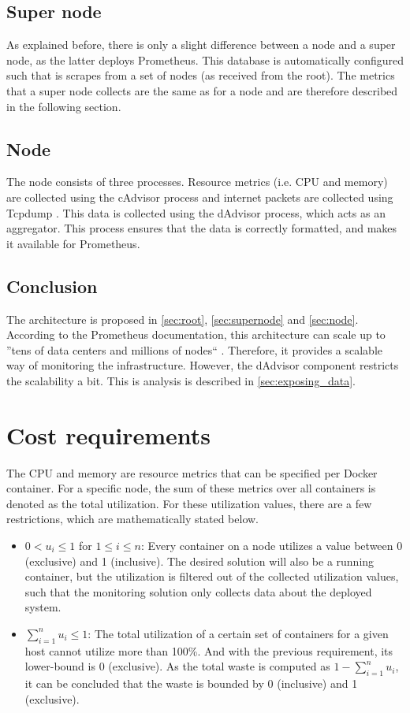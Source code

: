 \subsection{Super node} \label{sec:supernode}
As explained before, there is only a slight difference between a node and a super node, as the latter deploys Prometheus. This database is automatically configured such that is scrapes from a set of nodes (as received from the root). The metrics that a super node collects are the same as for a node and are therefore described in the following section.

\subsection{Node} \label{sec:node}
The node consists of three processes. Resource metrics (i.e. CPU and memory) are collected using the cAdvisor process and internet packets are collected using Tcpdump \cite{tcpdump}. This data is collected using the dAdvisor process, which acts as an aggregator. This process ensures that the data is correctly formatted, and makes it available for Prometheus.

\subsection{Conclusion}
The architecture is proposed in \autoref{sec:root}, \autoref{sec:supernode} and \autoref{sec:node}. According to the Prometheus documentation, this architecture can scale up to ''tens of data centers and millions of nodes`` \cite{prometheus_federation}. Therefore, it provides a scalable way of monitoring the infrastructure. However, the dAdvisor component restricts the scalability a bit. This is analysis is described in \autoref{sec:exposing_data}.

\section{Cost requirements} \label{sec:cost_req}
The CPU and memory are resource metrics that can be specified per Docker container. For a specific node, the sum of these metrics over all containers is denoted as the total utilization. For these utilization values, there are a few restrictions, which are mathematically stated below.

\begin{itemize}
    \item $0 < u_i \leq 1$ for $1 \leq i \leq n$: Every container on a node utilizes a value between 0 (exclusive) and 1 (inclusive). The desired solution will also be a running container, but the utilization is filtered out of the collected utilization values, such that the monitoring solution only collects data about the deployed system.
    \item $\sum_{i=1}^n u_i \leq 1$: The total utilization of a certain set of containers for a given host cannot utilize more than 100\%. And with the previous requirement, its lower-bound is 0 (exclusive). As the total waste is computed as $1 - \sum_{i=1}^n u_i$, it can be concluded that the waste is bounded by 0 (inclusive) and 1 (exclusive).
\end{itemize}


